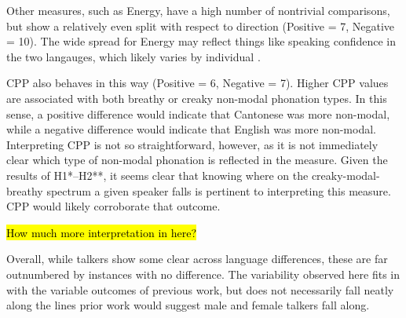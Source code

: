 Other measures, such as Energy, have a high number of nontrivial comparisons, but show a relatively even split with respect to direction (Positive = 7, Negative = 10). The wide spread for Energy may reflect things like speaking confidence in the two langauges, which likely varies by individual \citep{}.

CPP also behaves in this way (Positive = 6, Negative = 7). Higher CPP values are associated with both breathy or creaky non-modal phonation types. In this sense, a positive difference would indicate that Cantonese was more non-modal, while a negative difference would indicate that English was more non-modal. Interpreting CPP is not so straightforward, however, as it is not immediately clear which type of non-modal phonation is reflected in the measure. Given the results of H1*--H2**, it seems clear that knowing where on the creaky-modal-breathy spectrum a given speaker falls is pertinent to interpreting this measure. CPP would likely corroborate that outcome. 

\hl{How much more interpretation in here?}

Overall, while talkers show some clear across language differences, these are far outnumbered by instances with no difference. The variability observed here fits in with the variable outcomes of previous work, but does not necessarily fall neatly along the lines prior work would suggest male and female talkers fall along. 

